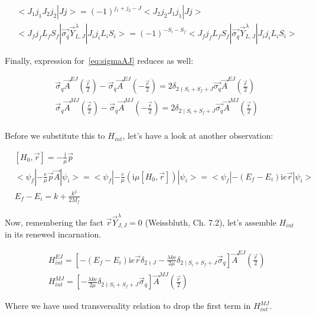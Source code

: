 \begin{align}
    &<J_1 j_1 J_2 j_2 | J j> = (-1)^{j_1 + j_2 - J} <J_2 j_2 J_1 j_1 | J j> \\
    &<J_f j_f L_f S_f| \vec{\sigma_{\overline{q}}} \vec{Y}_{L, J}^\lambda |J_i j_i L_i S_i> = (-1)^{-S_i - S_f} <J_f j_f L_f S_f| \vec{\sigma_{q}} \vec{Y}_{L, J}^\lambda |J_i j_i L_i S_i>
\end{align}

Finally, expression for~\cref{eq:sigmaAJ} reduces as well:

\begin{align}
    &\vec{\sigma}_{q} \vec{A}^{EJ}(\frac{\vec{r}}{2}) - \vec{\sigma}_{\overline{q}} \vec{A}^{EJ}(-\frac{\vec{r}}{2}) = 2 \delta_{2 \nmid S_i + S_f + J} \vec{\sigma_{q}} \vec{A}^{EJ}(\frac{\vec{r}}{2}) \\
    &\vec{\sigma}_{q} \vec{A}^{MJ}(\frac{\vec{r}}{2}) - \vec{\sigma}_{\overline{q}} \vec{A}^{MJ}(-\frac{\vec{r}}{2}) = 2 \delta_{2 \mid S_i + S_f + J} \vec{\sigma_{q}} \vec{A}^{MJ}(\frac{\vec{r}}{2}) \\
\end{align}

Before we substitute this to $H_{int}$, let's have a look at another observation:

\begin{align}
    &[H_0, \vec{r}] = -\frac{\mathrm{i}}{\mu} \vec{p} \\
    &<\psi_f| -\frac{e}{\mu} \vec{p} \vec{A} |\psi_i> = <\psi_f| -\frac{e}{\mu} \left( \mathrm{i} \mu [H_0, \vec{r}]  \right) |\psi_i> = <\psi_f| -(E_f - E_i) \mathrm{i} e \vec{r} |\psi_i> \\
    &E_f - E_i = k + \frac{k^2}{2 M_f}
\end{align}

Now, remembering the fact $\vec{r} \vec{Y}^\lambda_{J, J} = 0$ (Weissbluth, Ch. 7.2)\cite{weissbluth}, let's assemble $H_{int}$ in its renewed incarnation.

\begin{align}
    &H_{int}^{EJ} = \left[-(E_f - E_i) \mathrm{i} e \vec{r} \delta_{2 \nmid J} - \frac{\lambda k \mathrm{e}}{2 \mu} \delta_{2 \mid S_i + S_f + J} \vec{\sigma}_{q} \right] \vec{A}^{EJ}(\frac{\vec{r}}{2}) \\
    &H_{int}^{MJ} = \left[ -\frac{\lambda k \mathrm{e}}{2 \mu} \delta_{2 \nmid S_i + S_f + J} \vec{\sigma}_{q} \right] \vec{A}^{MJ}(\frac{\vec{r}}{2})
\end{align}

Where we have used transversality relation to drop the first term in $H_{int}^{MJ}$.

